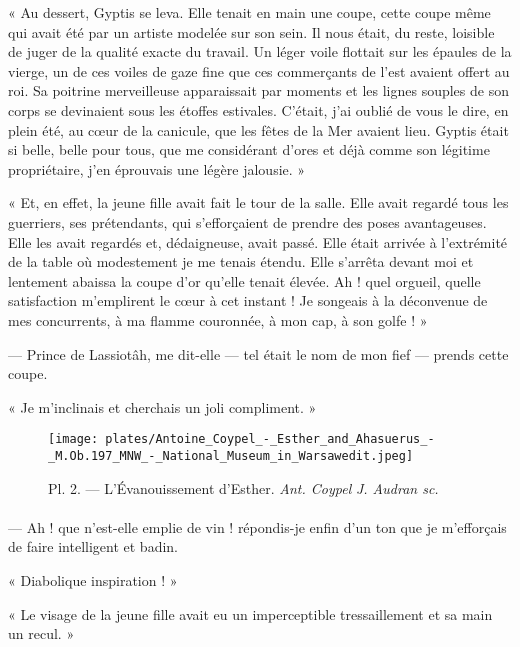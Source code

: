 \documentclass[a4paper, 11pt, oneside, polutonikogreek, french]{article}
\begin{document}
« Au dessert, Gyptis se leva. Elle tenait en main une coupe, cette coupe même qui avait été par un artiste modelée sur son sein. Il nous était, du reste, loisible de juger de la qualité exacte du travail. Un léger voile flottait sur les épaules de la vierge, un de ces voiles de gaze fine que ces commerçants de l'est avaient offert au roi. Sa poitrine merveilleuse apparaissait par moments et les lignes souples de son corps se devinaient sous les étoffes estivales. C'était, j'ai oublié de vous le dire, en plein été, au cœur de la canicule, que les fêtes de la Mer avaient lieu. Gyptis était si belle, belle pour tous, que me considérant d'ores et déjà comme son légitime propriétaire, j'en éprouvais une légère jalousie. »

« Et, en effet, la jeune fille avait fait le tour de la salle. Elle avait regardé tous les guerriers, ses prétendants, qui s'efforçaient de prendre des poses avantageuses. Elle les avait regardés et, dédaigneuse, avait passé. Elle était arrivée à l'extrémité de la table où modestement je me tenais étendu. Elle s'arrêta devant moi et lentement abaissa la coupe d'or qu'elle tenait élevée. Ah ! quel orgueil, quelle satisfaction m'emplirent le cœur à cet instant ! Je songeais à la déconvenue de mes concurrents, à ma flamme couronnée, à mon cap, à son golfe ! »

--- Prince de Lassiotâh, me dit-elle --- tel était le nom de mon fief --- prends cette coupe.

« Je m'inclinais et cherchais un joli compliment. »
\clearpage
\begin{landscape}
\begin{figure}[H]
\centering
\texttt{[image: plates/Antoine\_Coypel\_-\_Esther\_and\_Ahasuerus\_-\_M.Ob.197\_MNW\_-\_National\_Museum\_in\_Warsawedit.jpeg]}
\caption{\Fontauri Pl. 2. --- L'Évanouissement d'Esther. \emph{Ant. Coypel} \emph{J. Audran sc.}}
\end{figure}
\end{landscape}
\clearpage
\paragraph{}
--- Ah ! que n'est-elle emplie de vin ! répondis-je enfin d'un ton que je m'efforçais de faire intelligent et badin.

« Diabolique inspiration ! »

« Le visage de la jeune fille avait eu un imperceptible tressaillement et sa main un recul. »
\end{document}
